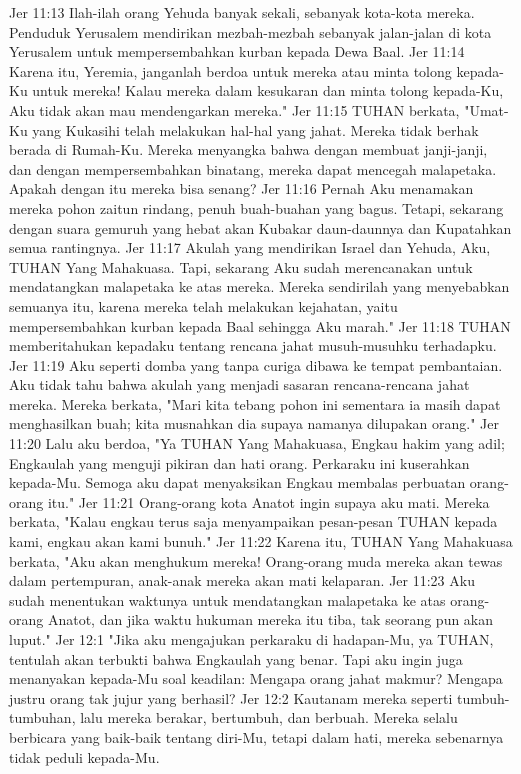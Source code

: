 Jer 11:13  Ilah-ilah orang Yehuda banyak sekali, sebanyak kota-kota mereka. Penduduk Yerusalem mendirikan mezbah-mezbah sebanyak jalan-jalan di kota Yerusalem untuk mempersembahkan kurban kepada Dewa Baal.
Jer 11:14  Karena itu, Yeremia, janganlah berdoa untuk mereka atau minta tolong kepada-Ku untuk mereka! Kalau mereka dalam kesukaran dan minta tolong kepada-Ku, Aku tidak akan mau mendengarkan mereka."
Jer 11:15  TUHAN berkata, "Umat-Ku yang Kukasihi telah melakukan hal-hal yang jahat. Mereka tidak berhak berada di Rumah-Ku. Mereka menyangka bahwa dengan membuat janji-janji, dan dengan mempersembahkan binatang, mereka dapat mencegah malapetaka. Apakah dengan itu mereka bisa senang?
Jer 11:16  Pernah Aku menamakan mereka pohon zaitun rindang, penuh buah-buahan yang bagus. Tetapi, sekarang dengan suara gemuruh yang hebat akan Kubakar daun-daunnya dan Kupatahkan semua rantingnya.
Jer 11:17  Akulah yang mendirikan Israel dan Yehuda, Aku, TUHAN Yang Mahakuasa. Tapi, sekarang Aku sudah merencanakan untuk mendatangkan malapetaka ke atas mereka. Mereka sendirilah yang menyebabkan semuanya itu, karena mereka telah melakukan kejahatan, yaitu mempersembahkan kurban kepada Baal sehingga Aku marah."
Jer 11:18  TUHAN memberitahukan kepadaku tentang rencana jahat musuh-musuhku terhadapku.
Jer 11:19  Aku seperti domba yang tanpa curiga dibawa ke tempat pembantaian. Aku tidak tahu bahwa akulah yang menjadi sasaran rencana-rencana jahat mereka. Mereka berkata, "Mari kita tebang pohon ini sementara ia masih dapat menghasilkan buah; kita musnahkan dia supaya namanya dilupakan orang."
Jer 11:20  Lalu aku berdoa, "Ya TUHAN Yang Mahakuasa, Engkau hakim yang adil; Engkaulah yang menguji pikiran dan hati orang. Perkaraku ini kuserahkan kepada-Mu. Semoga aku dapat menyaksikan Engkau membalas perbuatan orang-orang itu."
Jer 11:21  Orang-orang kota Anatot ingin supaya aku mati. Mereka berkata, "Kalau engkau terus saja menyampaikan pesan-pesan TUHAN kepada kami, engkau akan kami bunuh."
Jer 11:22  Karena itu, TUHAN Yang Mahakuasa berkata, "Aku akan menghukum mereka! Orang-orang muda mereka akan tewas dalam pertempuran, anak-anak mereka akan mati kelaparan.
Jer 11:23  Aku sudah menentukan waktunya untuk mendatangkan malapetaka ke atas orang-orang Anatot, dan jika waktu hukuman mereka itu tiba, tak seorang pun akan luput."
Jer 12:1  "Jika aku mengajukan perkaraku di hadapan-Mu, ya TUHAN, tentulah akan terbukti bahwa Engkaulah yang benar. Tapi aku ingin juga menanyakan kepada-Mu soal keadilan: Mengapa orang jahat makmur? Mengapa justru orang tak jujur yang berhasil?
Jer 12:2  Kautanam mereka seperti tumbuh-tumbuhan, lalu mereka berakar, bertumbuh, dan berbuah. Mereka selalu berbicara yang baik-baik tentang diri-Mu, tetapi dalam hati, mereka sebenarnya tidak peduli kepada-Mu.
